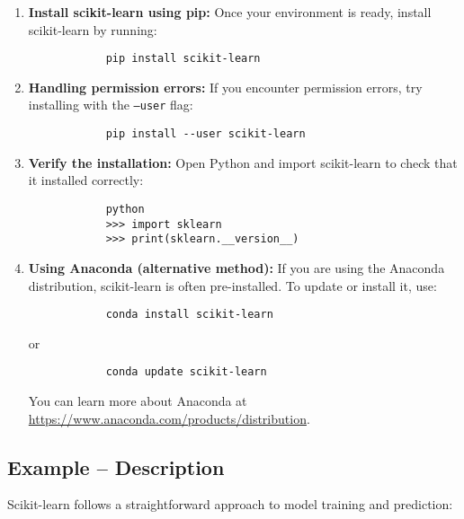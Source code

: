 \begin{enumerate}
	\item \textbf{Install scikit-learn using pip:}  
	Once your environment is ready, install scikit-learn by running:
	\begin{framed}
		\begin{verbatim}
			pip install scikit-learn
		\end{verbatim}
	\end{framed}
	
	\item \textbf{Handling permission errors:}  
	If you encounter permission errors, try installing with the \texttt{--user} flag:
	\begin{framed}
		\begin{verbatim}
			pip install --user scikit-learn
		\end{verbatim}
	\end{framed}
	
	\item \textbf{Verify the installation:}  
	Open Python and import scikit-learn to check that it installed correctly:
	\begin{framed}
		\begin{verbatim}
			python
			>>> import sklearn
			>>> print(sklearn.__version__)
		\end{verbatim}
	\end{framed}
	
	\item \textbf{Using Anaconda (alternative method):}  
	If you are using the Anaconda distribution, scikit-learn is often pre-installed. To update or install it, use:
	\begin{framed}
		\begin{verbatim}
			conda install scikit-learn
		\end{verbatim}
	\end{framed}
	or
	\begin{framed}
		\begin{verbatim}
			conda update scikit-learn
		\end{verbatim}
	\end{framed}
	You can learn more about Anaconda at \url{https://www.anaconda.com/products/distribution}.
\end{enumerate}

\subsection{Example -- Description}
Scikit-learn follows a straightforward approach to model training and prediction:

